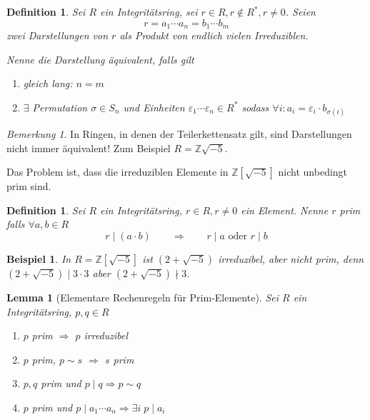 \documentclass[a4paper,12pt,numbers=noenddot,parskip=full]{scrartcl}
\newcommand{\setZ}{\mathbb{Z}}
\theoremstyle{dotless}
\newtheorem{lemma}[theorem]{Lemma}
\newtheorem{definition}[theorem]{Definition}
\newtheorem{example}[theorem]{Beispiel}
\theoremstyle{remark}
\newtheorem*{remark}{Bemerkung}
\begin{document}
 	\begin{definition}
 		Sei $R$ ein Integritätsring, sei $r \in R, r \notin R^*, r \neq 0$. Seien
 		\begin{equation*}
	 		r = a_1 \cdots a_n = b_1 \cdots b_m
 		\end{equation*}
 		zwei Darstellungen von $r$ als Produkt von endlich vielen Irreduziblen.
 		
 		Nenne die Darstellung äquivalent, falls gilt
 		\begin{enumerate}
 			\item gleich lang: $n = m$
 			\item $\exists$ Permutation $\sigma \in S_n$ und Einheiten $\varepsilon_1 \cdots \varepsilon_n \in R^*$ sodass $\forall i: a_i = \varepsilon_i \cdot b_{\sigma(i)}$
 		\end{enumerate}
 	\end{definition}
 
 	\begin{remark}
 		In Ringen, in denen der Teilerkettensatz gilt, sind Darstellungen nicht immer äquivalent! Zum Beispiel $R = \setZ{\sqrt{-5}}$.
 		
 		Das Problem ist, dass die irreduziblen Elemente in $\setZ[\sqrt{-5}]$ nicht unbedingt prim sind.
 	\end{remark}

	\begin{definition}
		Sei $R$ ein Integritätsring, $r \in R, r \neq 0$ ein Element. Nenne $r$ prim falls $\forall a,b \in R$
		\begin{equation*}
			r \mid (a \cdot b) \qquad \Longrightarrow \qquad r \mid a \text{ oder } r \mid b
		\end{equation*}
	\end{definition}

	\begin{example}
		In $R = \setZ[\sqrt{-5}]$ ist $(2 + \sqrt{-5})$ irreduzibel, aber  nicht prim, denn $(2 + \sqrt{-5}) \mid 3 \cdot 3$ aber $(2 + \sqrt{-5}) \nmid 3$.
	\end{example}

	\begin{lemma}[Elementare Rechenregeln für Prim-Elemente]
		Sei $R$ ein Integritätsring, $p,q \in R$
		\begin{enumerate}
			\item $p$ prim $\Rightarrow$ $p$ irreduzibel
			\item $p$ prim, $p \sim s$ $\Rightarrow$ $s$ prim
			\item $p,q$ prim und $p \mid q \Rightarrow p \sim q$
			\item $p$ prim und $p \mid a_1 \cdots a_n \Rightarrow \exists i \; p \mid a_i$
		\end{enumerate}
	\end{lemma}
\end{document}
